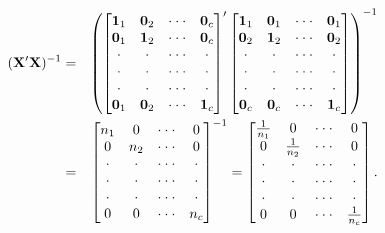\begin{center}
\begin{eqnarray}\label{E4:OneFactorXPrimeX}
(\mathbf{X^{\prime}X})^{-1} &=&\left(
\begin{bmatrix}
\mathbf{1}_1 & \mathbf{0}_2 & \cdot \cdot \cdot  & \mathbf{0}_c \\
\mathbf{0}_1 & \mathbf{1}_2 & \cdot \cdot \cdot  & \mathbf{0}_c \\
\cdot  & \cdot  & \cdot \cdot \cdot  & \cdot  \\
\cdot  & \cdot  & \cdot \cdot \cdot  & \cdot  \\
\cdot  & \cdot  & \cdot \cdot \cdot  & \cdot  \\
\mathbf{0}_1 & \mathbf{0}_2 & \cdot \cdot \cdot  & \mathbf{1}_c%
\end{bmatrix}^{\prime}%
\begin{bmatrix}
\mathbf{1}_1 & \mathbf{0}_1 & \cdot \cdot \cdot  & \mathbf{0}%
_1 \\
\mathbf{0}_2 & \mathbf{1}_2 & \cdot \cdot \cdot  & \mathbf{0}%
_2 \\
\cdot  & \cdot  & \cdot \cdot \cdot  & \cdot  \\
\cdot  & \cdot  & \cdot \cdot \cdot  & \cdot  \\
\cdot  & \cdot  & \cdot \cdot \cdot  & \cdot  \\
\mathbf{0}_{c} & \mathbf{0}_{c} & \cdot \cdot \cdot  & \mathbf{1}_c
\end{bmatrix} \notag
\right) ^{-1} \\
&=&%
\begin{bmatrix}
n_1 & 0 & \cdot \cdot \cdot  & 0 \\
0 & n_2 & \cdot \cdot \cdot  & 0 \\
\cdot  & \cdot  & \cdot \cdot \cdot  & \cdot  \\
\cdot  & \cdot  & \cdot \cdot \cdot  & \cdot  \\
\cdot  & \cdot  & \cdot \cdot \cdot  & \cdot  \\
0 & 0 & \cdot \cdot \cdot  & n_c%
\end{bmatrix}%
^{-1}=%
\begin{bmatrix}
\frac{1}{n_1} & 0 & \cdot \cdot \cdot  & 0 \\
0 & \frac{1}{n_2} & \cdot \cdot \cdot  & 0 \\
\cdot  & \cdot  & \cdot \cdot \cdot  & \cdot  \\
\cdot  & \cdot  & \cdot \cdot \cdot  & \cdot  \\
\cdot  & \cdot  & \cdot \cdot \cdot  & \cdot  \\
0 & 0 & \cdot \cdot \cdot  & \frac{1}{n_c}
\end{bmatrix}%
.
\end{eqnarray}
\end{center}

